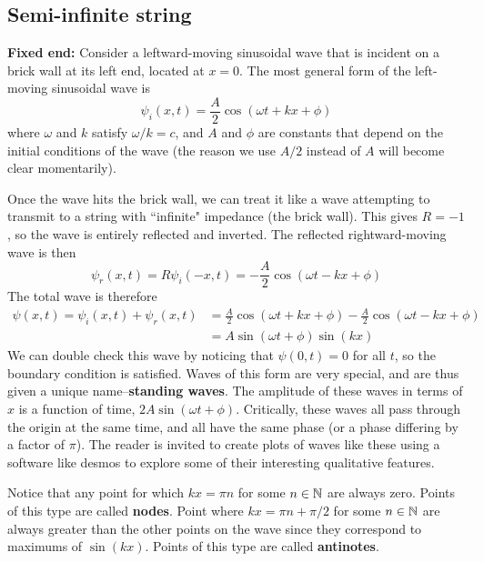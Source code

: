\subsection*{Semi-infinite string}
\textbf{Fixed end:} Consider a leftward-moving sinusoidal wave that is incident on a brick wall at its left end, located at $x=0$. The most general form of the left-moving sinusoidal wave is
\[ \psi_i(x,t) = \frac{A}{2} \cos(\omega t + kx + \phi) \]
where $\omega$ and $k$ satisfy $\omega/k = c$, and $A$ and $\phi$ are constants that depend on the initial conditions of the wave (the reason we use $A/2$ instead of $A$ will become clear momentarily). 

Once the wave hits the brick wall, we can treat it like a wave attempting to transmit to a string with ``infinite" impedance (the brick wall). This gives $R=-1$, so the wave is entirely reflected and inverted. The reflected rightward-moving wave is then
\[ \psi_r(x,t) = R\psi_i(-x, t) = -\frac{A}{2}\cos(\omega t - kx + \phi) \]
The total wave is therefore
\begin{align*}
    \psi(x,t) = \psi_i(x,t) + \psi_r(x,t) &= \frac{A}{2} \cos(\omega t+kx+\phi) - \frac{A}{2} \cos(\omega t-kx + \phi) \\
    &= A\sin(\omega t +\phi)\sin(kx)
\end{align*}
We can double check this wave by noticing that $\psi(0, t)=0$ for all $t$, so the boundary condition is satisfied. Waves of this form are very special, and are thus given a unique name--\textbf{standing waves}. The amplitude of these waves in terms of $x$ is a function of time, $2A\sin(\omega t+\phi)$. Critically, these waves all pass through the origin at the same time, and all have the same phase (or a phase differing by a factor of $\pi$). The reader is invited to create plots of waves like these using a software like desmos to explore some of their interesting qualitative features.  

Notice that any point for which $kx = \pi n$ for some $n\in \mathbb{N}$ are always zero. Points of this type are called \textbf{nodes}. Point where $kx = \pi n + \pi/2$ for some $n\in\mathbb{N}$ are always greater than the other points on the wave since they correspond to maximums of $\sin(kx)$. Points of this type are called \textbf{antinotes}.

